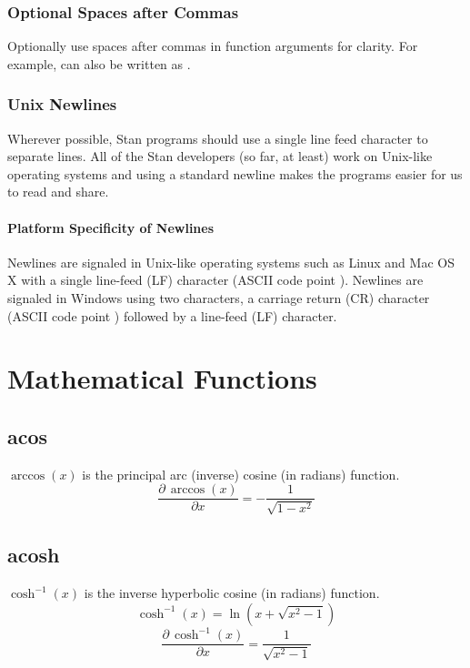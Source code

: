 \subsection{Optional Spaces after Commas}

Optionally use spaces after commas in function arguments for clarity.
For example,  can also be
written as .



\subsection{Unix Newlines}

Wherever possible, Stan programs should use a single line feed 
character to separate lines.  All of the Stan developers (so far, at 
least) work on Unix-like operating systems and using a standard 
newline makes the programs easier for us to read and share.  

\subsubsection{Platform Specificity of Newlines}

Newlines are signaled in Unix-like operating systems such as Linux and
Mac OS X with a single line-feed (LF) character (ASCII code point
).  Newlines are signaled in Windows using two characters,
a carriage return (CR) character (ASCII code point )
followed by a line-feed (LF) character.


\chapter{Mathematical Functions}\label{math-functions.appendix}

\section{acos}\label{acos-appendix.section}
$\arccos(x)$ is the principal arc (inverse) cosine (in radians) function.
%
\[
\frac{\partial \, \arccos(x)}{\partial x} = -\frac{1}{\sqrt{1-x^2}}
\]

\section{acosh}\label{acosh-appendix.section}
$\cosh^{-1}(x)$ is the inverse hyperbolic cosine (in radians) function.
%
\[
\cosh^{-1}(x)=\ln\left(x+\sqrt{x^2-1}\right)
\]
%
\[
\frac{\partial \, \cosh^{-1}(x)}{\partial x} = \frac{1}{\sqrt{x^2-1}}
\]

